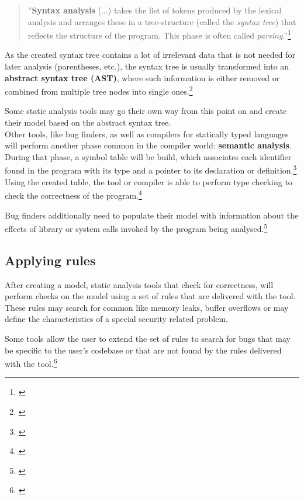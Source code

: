 \begin{quotation}
''\textbf{Syntax analysis} (...) takes the list of tokens produced by the lexical analysis and arranges these in a tree-structure (called the \textit{syntax tree}) that reflects the structure of the program. This phase is often called \textit{parsing}.''\footnote{\citep[2]{CompilerBasics}}
\end{quotation}

As the created syntax tree contains a lot of irrelevant data that is not needed for later analysis (parentheses, etc.), the syntax tree is usually transformed into an \textbf{abstract syntax tree (AST)}, where such information is either removed or combined from multiple tree nodes into single ones.\footnote{\citep[99]{CompilerBasics}}

Some static analysis tools may go their own way from this point on and create their model based on the abstract syntax tree.\\Other tools, like bug finders, as well as compilers for statically typed languages will perform another phase common in the compiler world: \textbf{semantic analysis}. During that phase, a symbol table will be build, which associates each identifier found in the program with its type and a pointer to its declaration or definition.\footnote{\citep[76]{SecureProgramming}} Using the created table, the tool or compiler is able to perform type checking to check the correctness of the program.\footnote{\citep[76]{SecureProgramming}}

Bug finders additionally need to populate their model with information about the effects of library or system calls invoked by the program being analysed.\footnote{\citep[37]{SecureProgramming}}

\subsection{Applying rules}

After creating a model, static analysis tools that check for correctness, will perform checks on the model using a set of rules that are delivered with the tool. These rules may search for common  like memory leaks, buffer overflows or may define the characteristics of a special security related problem.

Some tools allow the user to extend the set of rules to search for bugs that may be specific to the user's codebase or that are not found by the rules delivered with the tool.\footnote{\citep[97]{SecureProgramming}}

